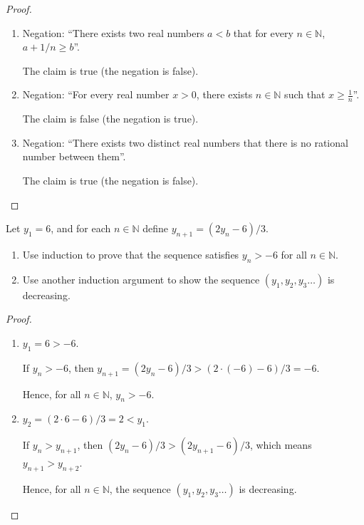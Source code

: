 \documentclass[class=understanding-analysis,crop=false]{standalone}
\begin{document}
\begin{proof}
    \begin{enumerate}[label = (\alph*)]
        \item Negation: ``There exists two real numbers $a < b$ that for every $n \in \mathbb{N}$, $a + 1/n \ge b$''.
              \par The claim is true (the negation is false).
        \item Negation: ``For every real number $x > 0$, there exists $n \in \mathbb{N}$ such that $x \ge \frac{1}{n}$''.
              \par The claim is false (the negation is true).
        \item Negation: ``There exists two distinct real numbers that there is no rational number between them''.
              \par The claim is true (the negation is false).
    \end{enumerate}
\end{proof}

\begin{exercise}
    \par Let $y_{1} = 6$, and for each $n \in \mathbb{N}$ define $y_{n+1} = (2y_{n} - 6)/3$.
    \begin{enumerate}[label = (\alph*)]
        \item Use induction to prove that the sequence satisfies $y_{n} > -6$ for all $n \in \mathbb{N}$.
        \item Use another induction argument to show the sequence $(y_{1}, y_{2}, y_{3}\ldots)$ is decreasing.
    \end{enumerate}
\end{exercise}

\begin{proof}
    \begin{enumerate}[label = (\alph*)]
        \item $y_{1} = 6 > -6$.
              \par If $y_{n} > -6$, then $y_{n+1} = (2y_{n} - 6) / 3 > (2\cdot (-6) - 6) / 3 = -6$.
              \par Hence, for all $n \in \mathbb{N}$, $y_{n} > -6$.
        \item $y_{2} = (2\cdot 6 - 6) / 3 = 2 < y_{1}$.
              \par If $y_{n} > y_{n+1}$, then $(2y_{n} - 6)/3 > (2y_{n+1} - 6)/3$, which means $y_{n+1} > y_{n+2}$.
              \par Hence, for all $n \in \mathbb{N}$, the sequence $(y_{1}, y_{2}, y_{3}\ldots)$ is decreasing.
    \end{enumerate}
\end{proof}
\end{document}
